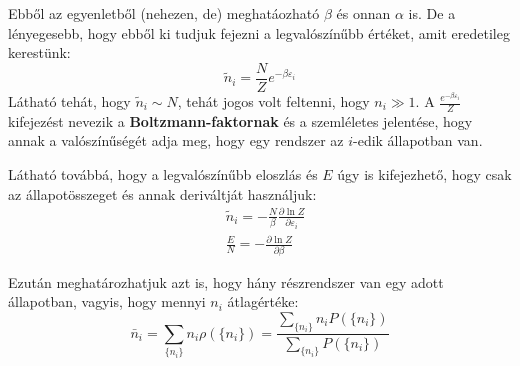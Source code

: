 \documentclass[../main.tex]{subfiles}
\begin{document}
Ebből az egyenletből (nehezen, de) meghatáozható $\beta$ és onnan $\alpha$ is. De a lényegesebb, hogy ebből ki tudjuk fejezni a legvalószínűbb értéket, amit eredetileg kerestünk:
\begin{equation}
    \tilde{n}_i = \frac{N}{Z} e^{- \beta \varepsilon_i}
\end{equation}
Látható tehát, hogy $\tilde{n}_i \sim N$, tehát jogos volt feltenni, hogy $n_i \gg 1$. A $\frac{e^{-\beta\varepsilon_i}}{Z}$ kifejezést nevezik a \textbf{Boltzmann-faktornak} és a szemléletes jelentése, hogy
annak a valószínűségét adja meg, hogy egy rendszer az $i$-edik állapotban van. 

Látható továbbá, hogy a legvalószínűbb eloszlás és $E$ úgy is kifejezhető, hogy csak az állapotösszeget és annak deriváltját használjuk:
\begin{equation}
    \begin{aligned}
        &\tilde{n}_i = - \frac{N}{\beta} \frac{\partial \ln Z}{\partial \varepsilon_i} \\
        &\frac{E}{N} = - \frac{\partial \ln Z}{\partial \beta} 
    \end{aligned}
\end{equation}

Ezután meghatározhatjuk azt is, hogy hány részrendszer van egy adott állapotban, vagyis, hogy mennyi $n_i$ átlagértéke:
\begin{equation}
    \bar{n}_i = \sum_{\{n_i\}} n_i \rho(\{n_i\}) = \frac{\sum_{\{n_i\}} n_i P(\{n_i\})}{\sum_{\{n_i\}} P(\{n_i\})}
\end{equation}
\end{document}
